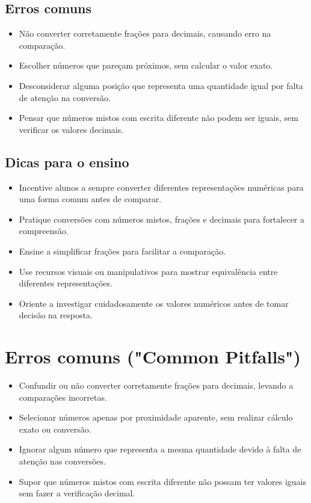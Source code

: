\documentclass{article}
\begin{document}
\subsection{Erros comuns}
\begin{itemize}
  \item Não converter corretamente frações para decimais, causando erro na comparação.
  \item Escolher números que pareçam próximos, sem calcular o valor exato.
  \item Desconsiderar alguma posição que representa uma quantidade igual por falta de atenção na conversão.
  \item Pensar que números mistos com escrita diferente não podem ser iguais, sem verificar os valores decimais.
\end{itemize}

\subsection{Dicas para o ensino}
\begin{itemize}
  \item Incentive alunos a sempre converter diferentes representações numéricas para uma forma comum antes de comparar.
  \item Pratique conversões com números mistos, frações e decimais para fortalecer a compreensão.
  \item Ensine a simplificar frações para facilitar a comparação.
  \item Use recursos visuais ou manipulativos para mostrar equivalência entre diferentes representações.
  \item Oriente a investigar cuidadosamente os valores numéricos antes de tomar decisão na resposta.
\end{itemize}

\section{Erros comuns ("Common Pitfalls")}
\begin{itemize}
  \item Confundir ou não converter corretamente frações para decimais, levando a comparações incorretas.
  \item Selecionar números apenas por proximidade aparente, sem realizar cálculo exato ou conversão.
  \item Ignorar algum número que representa a mesma quantidade devido à falta de atenção nas conversões.
  \item Supor que números mistos com escrita diferente não possam ter valores iguais sem fazer a verificação decimal.
\end{itemize}
\end{document}
